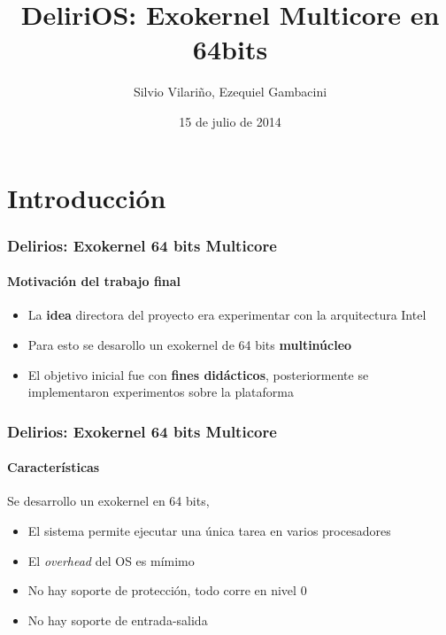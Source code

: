 \documentclass{beamer}
\title{DeliriOS: Exokernel Multicore en 64bits}
\author{Silvio Vilariño, Ezequiel Gambacini}
\date{15 de julio de 2014}
\begin{document}
\begin{frame}
  \maketitle
\end{frame}

\section{Introducción}
  
\begin{frame}
  \frametitle{Delirios: Exokernel 64 bits Multicore}    
  \framesubtitle{Motivación del trabajo final}
  \begin{itemize}
    \setlength{\itemsep}{20pt}
    \item La \textbf{idea} directora del proyecto era experimentar con la arquitectura Intel
    \item Para esto se desarollo un exokernel de 64 bits \textbf{multinúcleo}
    \item El objetivo inicial fue con \textbf{fines didácticos}, posteriormente se implementaron experimentos sobre la plataforma
  \end{itemize}
\end{frame}
  
\begin{frame}
  \frametitle{Delirios: Exokernel 64 bits Multicore}
  \framesubtitle{Características}
  Se desarrollo un exokernel en 64 bits,
  \vspace{15pt}
  \begin{itemize}
    \setlength{\itemsep}{15pt}
    \item El sistema permite ejecutar una única tarea en varios procesadores
    \item El \emph{overhead} del OS es mímimo
    \item No hay soporte de protección, todo corre en nivel $0$
    \item No hay soporte de entrada-salida
  \end{itemize}
\end{frame}
\end{document}
